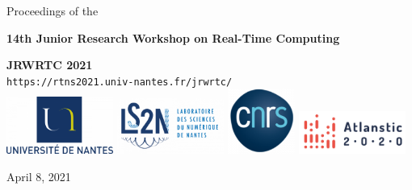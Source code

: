 \documentclass[10pt]{article}
\newcommand\blankpage{%
	\null
	\thispagestyle{empty}%
	\addtocounter{page}{-1}%
	\newpage}
\begin{document}


\begin{center}
	\thispagestyle{empty}
	\vspace*{\fill}
	\LARGE{Proceedings of the}\\[-0.9ex]
	\vspace{0.1cm}
	\begin{center}

		\vspace{0.1cm}
		\textbf{\LARGE{14th Junior Research Workshop on Real-Time Computing}}
		\bigskip\par

		\textbf{\LARGE{JRWRTC 2021}}\\
		\vspace{0.3cm}
		\large{\texttt{https://rtns2021.univ-nantes.fr/jrwrtc/}}\\[-0.5ex]
		\vspace{1cm}
		\includegraphics[width=3.5cm]{imgs/logo-un-768x413.png}
		\includegraphics[width=3.5cm]{imgs/LOGOS-LS2N-e1602231001594-768x400.png}
		\includegraphics[width=2.2cm]{imgs/cnrs-3-e1612193794303.png}
		\includegraphics[width=3.5cm]{imgs/image.png}

		\vspace{1cm}
		
		\large{April 8, 2021}\\[-1ex]
		\vspace{0.6cm}

	\end{center}
	\vspace*{\fill}
\end{center}
\afterpage{\null\blankpage}
\end{document}
